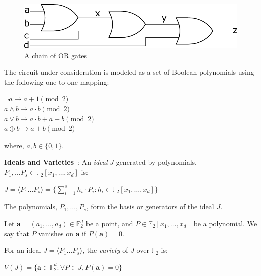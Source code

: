\documentclass{article}
\theoremstyle{definition}
\begin{document}
\begin{figure}
\centering
\includegraphics[scale=0.60]{Chain_Or_Gates.pdf}
\caption{A chain of OR gates}
\label{ChainOrGate}
\end{figure}
\par
The circuit under consideration is modeled as a set of Boolean polynomials using the following one-to-one mapping:
\begin{center}
$\neg a\rightarrow a + 1 \pmod{2}$ \\
$a \wedge b \rightarrow a \cdot b \pmod{2}$ \\
$a \vee b \rightarrow a \cdot b + a+ b \pmod{2}$\\
$a \oplus b \rightarrow a+b \pmod{2}$\\
\end{center} 
where, $a,b \in \{0,1\}$.
\par
\textbf{Ideals and Varieties}~\cite{lv}: An \textit{ideal} $J$ generated by polynomials, $P_1,\dots P_s \in \mathbb{F}_2[x_1, \dots, x_d]$ is:
\begin{center}
$J = \langle P_1 \dots P_s \rangle = \{\sum_{i=1}^{s} h_i\cdot P_i: h_i \in \mathbb{F}_2[x_1,\dots, x_d]\}$
\end{center}
The polynomials, $P_1,\dots,P_s$, form the basis or generators of the ideal $J$. 
\par 
Let $\textbf{a} = (a_1,\dots, a_d) \in \mathbb{F}_{2}^{d}$ be a point, and $P \in \mathbb{F}_2[x_1,\dots,x_d]$ be a polynomial. We say that $P$ vanishes on $\textbf{a}$ if $P(\textbf{a}) = 0$. 
\par
For an ideal $J =  \langle P_1 \dots P_s \rangle$, the \textit{variety} of $J$ over $\mathbb{F}_2$ is:
\begin{center}
$V(J) = \{\textbf{a} \in \mathbb{F}_{2}^{d} : \forall P \in J, P(\textbf{a}) = 0\}$
\end{center}
\end{document}
